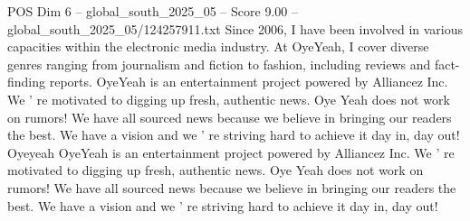 \begin{textsample}{POS Dim 6 – global\_south\_2025\_05 – Score 9.00 – global\_south\_2025\_05/124257911.txt}
Since 2006, I have been involved in various capacities within the electronic media industry.
At OyeYeah, I cover diverse genres ranging from journalism and fiction to fashion, including reviews and fact-finding reports.
OyeYeah is an entertainment project powered by Alliancez Inc.
We ' re motivated to digging up fresh, authentic news.
Oye Yeah does not work on rumors!
We have all sourced news because we believe in bringing our readers the best.
We have a vision and we ' re striving hard to achieve it day in, day out!
Oyeyeah OyeYeah is an entertainment project powered by Alliancez Inc.
We ' re motivated to digging up fresh, authentic news.
Oye Yeah does not work on rumors!
We have all sourced news because we believe in bringing our readers the best.
We have a vision and we ' re striving hard to achieve it day in, day out!

\end{textsample}
